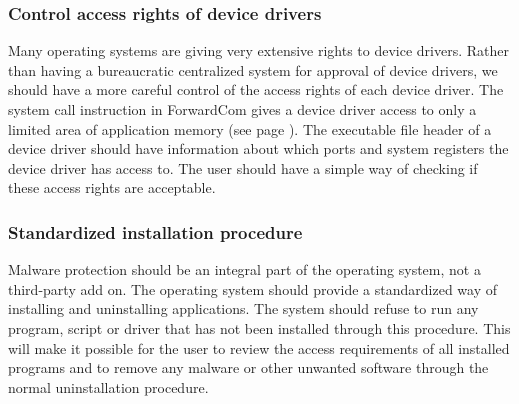 \documentclass[forwardcom.tex]{subfiles}
\begin{document}
\subsubsection{Control access rights of device drivers} 
Many operating systems are giving very extensive rights to device drivers. Rather than having a bureaucratic centralized system for approval of device drivers, we should have a more careful control of the access rights of each device driver. The system call instruction in ForwardCom gives a device driver access to only a limited area of application memory (see page \pageref{systemCallInstruction}). The executable file header of a device driver should have information about which ports and system registers the device driver has access to. The user should have a simple way of checking if these access rights are acceptable.

\subsubsection{Standardized installation procedure} 
Malware protection should be an integral part of the operating system, not a third-party add on. The operating system should provide a standardized way of installing and uninstalling applications. The system should refuse to run any program, script or driver that has not been installed through this procedure. This will make it possible for the user to review the access requirements of all installed programs and to remove any malware or other unwanted software through the normal uninstallation procedure.
\end{document}
